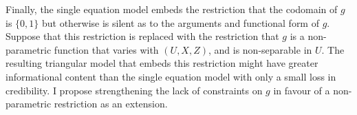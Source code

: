 \documentclass[12pt,a4paper,twoside]{article}
\numberwithin{equation}{section}
\begin{document}
Finally, the single equation model embeds the restriction that the codomain of $g$ is $\lbrace 0,1\rbrace$ but otherwise is silent as to the arguments and functional form of $g$. Suppose that this restriction is replaced with the restriction that $g$ is a non-parametric function that varies with $(U,X,Z)$, and is non-separable in $U$. The resulting triangular model that embeds this restriction might have greater informational content than the single equation model with only a small loss in credibility. I propose strengthening the lack of constraints on $g$ in favour of a non-parametric restriction as an extension.
%
\end{document}
